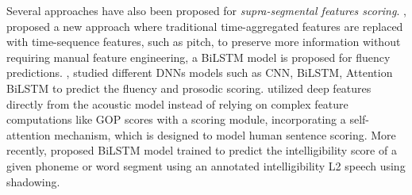 \documentclass[11pt]{article}
\begin{document}







Several approaches have also been proposed for \textit{supra-segmental features scoring}. \citet{7404814}, proposed a new approach where traditional time-aggregated features are replaced with time-sequence features, such as pitch, to preserve more information without requiring manual feature engineering, a BiLSTM model is proposed for fluency predictions. \citet{7472857, chen2018end}, studied different DNNs models such as CNN, BiLSTM, Attention BiLSTM to predict the fluency and prosodic scoring. \cite{lin2021deep} utilized deep features directly from the acoustic model instead of relying on complex feature computations like GOP scores with a scoring module, incorporating a self-attention mechanism, which is designed to model human sentence scoring. More recently, \cite{10023307} proposed BiLSTM model trained to predict the intelligibility score of a given phoneme or word segment using an annotated intelligibility L2 speech using shadowing.
\end{document}
